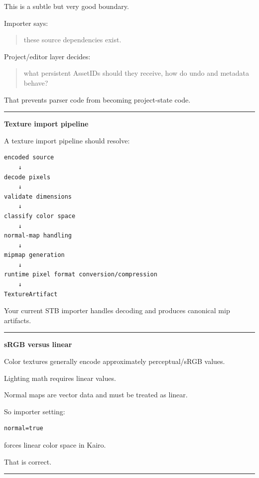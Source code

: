 This is a subtle but very good boundary.

Importer says:

\begin{quote}
these source dependencies exist.
\end{quote}

Project/editor layer decides:

\begin{quote}
what persistent AssetIDs should they receive, how do undo and metadata behave?
\end{quote}

That prevents parser code from becoming project-state code.

\begin{center}\rule{0.5\linewidth}{0.5pt}\end{center}

\textbf{Texture import pipeline}

A texture import pipeline should resolve:

\begin{verbatim}
encoded source
    ↓
decode pixels
    ↓
validate dimensions
    ↓
classify color space
    ↓
normal-map handling
    ↓
mipmap generation
    ↓
runtime pixel format conversion/compression
    ↓
TextureArtifact
\end{verbatim}

Your current STB importer handles decoding and produces canonical mip artifacts.

\begin{center}\rule{0.5\linewidth}{0.5pt}\end{center}

\textbf{sRGB versus linear}

Color textures generally encode approximately perceptual/sRGB values.

Lighting math requires linear values.

Normal maps are vector data and must be treated as linear.

So importer setting:

\begin{verbatim}
normal=true
\end{verbatim}

forces linear color space in Kairo.

That is correct.

\begin{center}\rule{0.5\linewidth}{0.5pt}\end{center}

